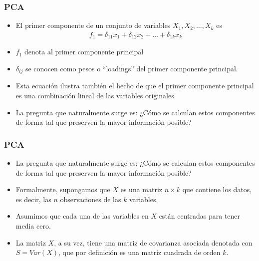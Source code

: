 \documentclass[
  shownotes,
  xcolor={svgnames},
  hyperref={colorlinks,citecolor=DarkBlue,linkcolor=DarkRed,urlcolor=DarkBlue}
  , aspectratio=169]{beamer}
\begin{document}
\begin{frame}
\frametitle{PCA}

\begin{itemize}


\item El primer componente de un conjunto de variables \(X_1,X_2,\dots,X_k\) es
\medskip
\begin{align}
f_1= \delta_{11} x_1+ \delta_{12} x_2 + \dots + \delta_{1k} x_k
\end{align}

\item  \(f_1\) denota al primer componente principal 
\medskip
\item  \(\delta_{ij}\) se conocen como pesos o ``loadings'' del primer componente principal. 
\medskip
\item Esta ecuación ilustra también el hecho de que el primer componente principal es una combinación lineal de las variables
originales. 
\medskip
\pause
\item La pregunta que naturalmente surge es: ¿Cómo se calculan estos componentes de forma tal que preserven la mayor información posible?
\end{itemize}
\end{frame}
\begin{frame}
\frametitle{PCA}
\begin{itemize}
\item La pregunta que naturalmente surge es: ¿Cómo se calculan estos componentes de forma tal que preserven la mayor información posible?

\medskip
\item Formalmente, supongamos que \(X\) es una matriz \(n \times k\) que contiene los datos, es decir, las \(n\) observaciones de las \(k\)
variables.
\medskip
\item  Asumimos que cada una de las variables en \(X\) están centradas para tener media cero. 

\medskip
\item  La matriz \(X\), a su vez, tiene una matriz de covarianza asociada denotada con \(S=Var(X)\), que por definición es una matriz cuadrada de orden \(k\).

\end{itemize}
\end{frame}
\end{document}
